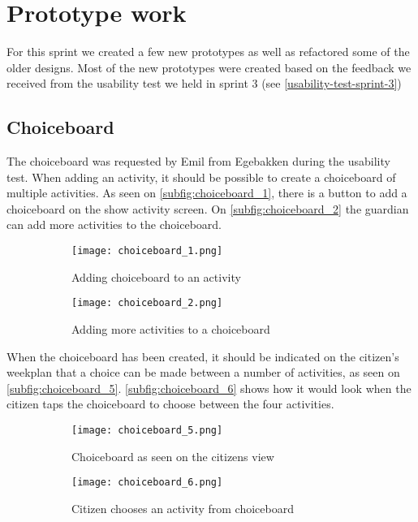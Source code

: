  \section{Prototype work}
For this sprint we created a few new prototypes as well as refactored some of the older designs. 
Most of the new prototypes were created based on the feedback we received from the usability test we held in sprint 3 (see \autoref{usability-test-sprint-3})

\subsection{Choiceboard}
The choiceboard was requested by Emil from Egebakken during the usability test. 
When adding an activity, it should be possible to create a choiceboard of multiple activities. 
As seen on \autoref{subfig:choiceboard_1}, there is a button to add a choiceboard on the show activity screen. 
On \autoref{subfig:choiceboard_2} the guardian can add more activities to the choiceboard.
\begin{figure}[H]
    \begin{subfigure}{0.5\textwidth}
    \texttt{[image: choiceboard\_1.png]}
    \caption{Adding choiceboard to an activity}
    \label{subfig:choiceboard_1}
    \end{subfigure}
    \begin{subfigure}{0.5\textwidth}
    \texttt{[image: choiceboard\_2.png]}
    \caption{Adding more activities to a choiceboard}
    \label{subfig:choiceboard_2}
    \end{subfigure} 
    \caption{}
    \label{fig:choiceboardadd}
\end{figure}
\noindent
When the choiceboard has been created, it should be indicated on the citizen's weekplan that a choice can be made between a number of activities, as seen on \autoref{subfig:choiceboard_5}.
\autoref{subfig:choiceboard_6} shows how it would look when the citizen taps the choiceboard to choose between the four activities.
\begin{figure}[H]
    \begin{subfigure}{0.5\textwidth}
    \texttt{[image: choiceboard\_5.png]}
    \caption{Choiceboard as seen on the citizens view}
    \label{subfig:choiceboard_5}
    \end{subfigure}
    \begin{subfigure}{0.5\textwidth}
        \texttt{[image: choiceboard\_6.png]}
    \caption{Citizen chooses an activity from choiceboard}
    \label{subfig:choiceboard_6}
    \end{subfigure} 
    \caption{}
    \label{fig:choiceboardcitizen}
\end{figure}

